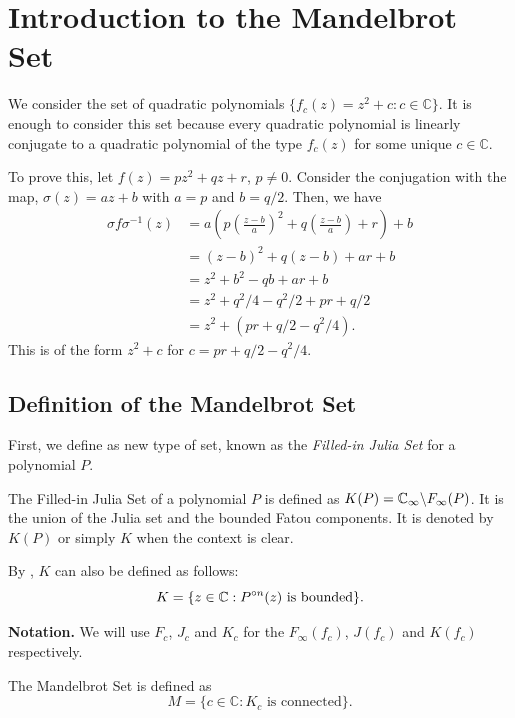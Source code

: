\chapter{Introduction to the Mandelbrot Set}
We consider the set of quadratic polynomials \( \{f_c(z)=z^2+c:c\in \mathbb{C}\} \). It is
enough to consider this set because every quadratic polynomial is linearly conjugate to a quadratic
polynomial of the type \( f_c(z) \) for some unique \( c\in \mathbb{C} \).

To prove this, let \( f(z)=pz^2+qz+r \), \( p\neq 0 \). Consider the conjugation with
the map, \( \sigma(z)=az+b \) with \( a=p \) and \( b=q /2 \). Then, we have
\begin{align*}
	\sigma f \sigma^{-1}(z)&=a\left(p\left(\frac{z-b}{a}\right)^2+q\left( \frac{z-b}{a}\right) +r  \right)+b\\
						   &=(z-b)^2+q(z-b)+ar+b\\
						   &=z^2+b^2-qb+ar+b\\
						   &=z^2+q^2 /4-q^2 /2+pr+q /2\\
						   &=z^2+(pr+q /2-q^2 /4)
.\end{align*}
This is of the form \( z^2+c \) for \( c=pr+q /2-q^2 /4 \).

\section{Definition of the Mandelbrot Set}
First, we define as new type of set, known as the \emph{Filled-in Julia Set} for a polynomial \( P \).

\begin{definition}
The Filled-in Julia Set of a polynomial \( P \)	is defined as \( K(P)=\mathbb{C}_\infty\backslash F_\infty(P) \). It
is the union of the Julia set and the bounded Fatou components.
It is denoted by \( K(P) \) or simply \( K \) when the context is clear.
\end{definition}
\noindent By , \( K \) can also be defined as follows:\[
	K=\{z\in \mathbb{C}:\pop[n](z)\text{ is bounded}\}
.\] 

\noindent \textbf{Notation.} We will use \( F_c \), \( J_c \) and \( K_c \) for the 
\( F_\infty(f_c) \), \( J(f_c) \) and \( K(f_c) \) respectively.

\begin{definition}
	The Mandelbrot Set is defined as \[ 
	M=\{c\in \mathbb{C}:K_c \text{ is connected}\}. 
\]
\end{definition}

